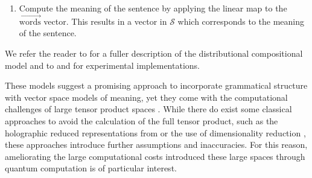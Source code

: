 \begin{enumerate}
\begin{equation}
\begin{aligned}
\begin{tikzpicture}[scale=0.5, yscale=-1]
\begin{pgfonlayer}{nodelayer}
                \node [style=none] (28) at (3.75, -0.5) {};
                \node [style=none] (29) at (0.5, -1.75) {};
                \node [style=none] (30) at (-2.75, 2.75) {Mary};
                \node [style=none] (31) at (0.5, 2.75) {likes};
                \node [style=none] (32) at (3.75, 2.75) {words.};
        \end{pgfonlayer}
        \begin{pgfonlayer}{edgelayer}
                \draw [style = thick] (0.center) to (1.center);
                \draw [style = thick] (1.center) to (2.center);
                \draw [style = thick] (2.center) to (0.center);
                \draw [style = thick]  (3.center) to (4.center);
                \draw [style = thick] (8.center) to (6.center);
                \draw [style = thick] (6.center) to (7.center);
                \draw [style = thick] (4.center) to (5.center);
                \draw [style = thick] (3.center) to (5.center);
                \draw [style = thick] (8.center) to (7.center);
                \draw [style = thick] (9.center) to (14.center);
                \draw [style = thick] (10.center) to (15.center);
                \draw [style = thick] (11.center) to (16.center);
                \draw [style = thick] (12.center) to (17.center);
                \draw [style = thick] (13.center) to (18.center);
                \draw [thick, bend right=90, looseness=1.25] (24.center) to (25.center);
                \draw [thick, bend right=90, looseness=1.25] (27.center) to (28.center);
                \draw [style = thick] (26.center) to (29.center);
        \end{pgfonlayer}
\end{tikzpicture}
\end{aligned}
\end{equation}

\item Compute the meaning of the sentence by applying the linear map to the $\overrightarrow{\mbox{words}}$ vector. This results in a vector in $\mathcal{S}$ which corresponds to the meaning of the sentence.
\end{enumerate}

\noindent We refer the reader to \cite{coecke2010mathematical} for a fuller description of the distributional compositional model and to \cite{experimental-catcompdist} and \cite{kartsaklis2012unified} for experimental implementations.

These models suggest a promising approach to incorporate grammatical structure with vector space models of meaning, yet they come with the computational challenges of large tensor product spaces \cite{GrefenstetteThesis2013}. While there do exist some classical approaches to avoid the calculation of the full tensor product, such as the holographic reduced representations from \cite{plate1991holographic} or the use of dimensionality reduction \cite{polajnar2013learning}, these approaches introduce further assumptions and inaccuracies.  For this reason, ameliorating the large computational costs introduced these large spaces through quantum computation is of particular interest.

